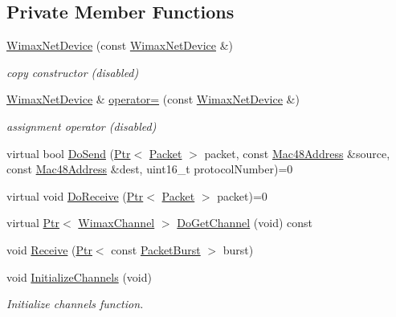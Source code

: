 \subsection*{Private Member Functions}
\begin{DoxyCompactItemize}
\item 
\hyperlink{classns3_1_1WimaxNetDevice_acc6253b92b569f075ffb7a1c1ad749f9}{Wimax\+Net\+Device} (const \hyperlink{classns3_1_1WimaxNetDevice}{Wimax\+Net\+Device} \&)
\begin{DoxyCompactList}\small\item\em copy constructor (disabled) \end{DoxyCompactList}\item 
\hyperlink{classns3_1_1WimaxNetDevice}{Wimax\+Net\+Device} \& \hyperlink{classns3_1_1WimaxNetDevice_ab27b51e3820f61d9e90de8d3e36d22e7}{operator=} (const \hyperlink{classns3_1_1WimaxNetDevice}{Wimax\+Net\+Device} \&)
\begin{DoxyCompactList}\small\item\em assignment operator (disabled) \end{DoxyCompactList}\item 
virtual bool \hyperlink{classns3_1_1WimaxNetDevice_a3b275b11f4c195ca15812a4c262fb460}{Do\+Send} (\hyperlink{classns3_1_1Ptr}{Ptr}$<$ \hyperlink{classns3_1_1Packet}{Packet} $>$ packet, const \hyperlink{classns3_1_1Mac48Address}{Mac48\+Address} \&source, const \hyperlink{classns3_1_1Mac48Address}{Mac48\+Address} \&dest, uint16\+\_\+t protocol\+Number)=0
\item 
virtual void \hyperlink{classns3_1_1WimaxNetDevice_a9c27ed8c265ca1516ee289c6a02a75fa}{Do\+Receive} (\hyperlink{classns3_1_1Ptr}{Ptr}$<$ \hyperlink{classns3_1_1Packet}{Packet} $>$ packet)=0
\item 
virtual \hyperlink{classns3_1_1Ptr}{Ptr}$<$ \hyperlink{classns3_1_1WimaxChannel}{Wimax\+Channel} $>$ \hyperlink{classns3_1_1WimaxNetDevice_a204bdc37e9fed89b44ed83a3e1802dcf}{Do\+Get\+Channel} (void) const 
\item 
void \hyperlink{classns3_1_1WimaxNetDevice_a14cc3e344c48ec645e65242cfcbb80d7}{Receive} (\hyperlink{classns3_1_1Ptr}{Ptr}$<$ const \hyperlink{classns3_1_1PacketBurst}{Packet\+Burst} $>$ burst)
\item 
void \hyperlink{classns3_1_1WimaxNetDevice_ad6b0c116ca801bf48e3023b3a49fc6f8}{Initialize\+Channels} (void)
\begin{DoxyCompactList}\small\item\em Initialize channels function. \end{DoxyCompactList}\end{DoxyCompactItemize}
